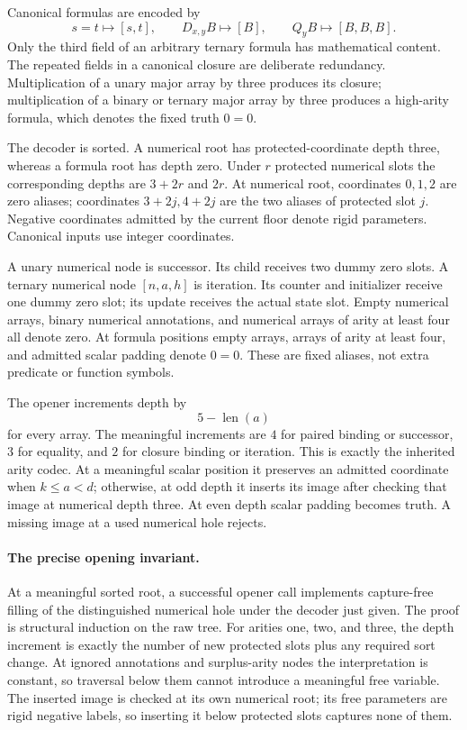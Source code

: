 \documentclass[11pt,letterpaper]{article}
\theoremstyle{definition}\newtheorem{definition}[theorem]{Definition}
\theoremstyle{remark}\newtheorem{remark}[theorem]{Remark}
\begin{document}
Canonical formulas are encoded by
\[
 s=t\longmapsto[s,t],\qquad
 D_{x,y}B\longmapsto[B],\qquad
 Q_yB\longmapsto[B,B,B].
\]
Only the third field of an arbitrary ternary formula has mathematical
content.  The repeated fields in a canonical closure are deliberate
redundancy.  Multiplication of a unary major array by three produces its
closure; multiplication of a binary or ternary major array by three
produces a high-arity formula, which denotes the fixed truth $0=0$.

The decoder is sorted.  A numerical root has protected-coordinate depth
three, whereas a formula root has depth zero.  Under $r$ protected
numerical slots the corresponding depths are $3+2r$ and $2r$.
At numerical root, coordinates $0,1,2$ are zero aliases; coordinates
$3+2j,4+2j$ are the two aliases of protected slot $j$.  Negative
coordinates admitted by the current floor denote rigid parameters.
Canonical inputs use integer coordinates.

A unary numerical node is successor.  Its child receives two dummy
zero slots.  A ternary numerical node $[n,a,h]$ is iteration.  Its
counter and initializer receive one dummy zero slot; its update
receives the actual state slot.  Empty numerical arrays, binary
numerical annotations, and numerical arrays of arity at least four
all denote zero.  At formula positions empty arrays, arrays of arity
at least four, and admitted scalar padding denote $0=0$.
These are fixed aliases, not extra predicate or function symbols.

The opener increments depth by
\[
                       5-\operatorname{len}(a)
\]
for every array.  The meaningful increments are $4$ for paired
binding or successor, $3$ for equality, and $2$ for closure binding
or iteration.  This is exactly the inherited arity codec.
At a meaningful scalar position it preserves an admitted coordinate
when $k\leq a<d$; otherwise, at odd depth it inserts its image after
checking that image at numerical depth three.  At even depth scalar
padding becomes truth.  A missing image at a used numerical hole
rejects.

\paragraph{The precise opening invariant.}
At a meaningful sorted root, a successful opener call implements
capture-free filling of the distinguished numerical hole under the
decoder just given.  The proof is structural induction on the raw tree.
For arities one, two, and three, the depth increment is exactly the
number of new protected slots plus any required sort change.  At
ignored annotations and surplus-arity nodes the interpretation is
constant, so traversal below them cannot introduce a meaningful free
variable.  The inserted image is checked at its own numerical root;
its free parameters are rigid negative labels, so inserting it below
protected slots captures none of them.
\end{document}
